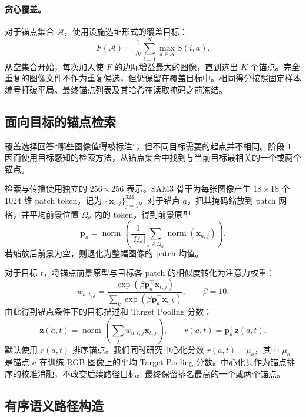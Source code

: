 \documentclass[UTF8,a4paper,10pt]{ctexart}
\begin{document}
\paragraph{贪心覆盖。}
对于锚点集合 $\mathcal{A}$，使用设施选址形式的覆盖目标：
\begin{equation}
F(\mathcal{A})=\frac{1}{N}\sum_{i=1}^{N}\max_{a\in\mathcal{A}}S(i,a).
\end{equation}
从空集合开始，每次加入使 $F$ 的边际增益最大的图像，直到选出 $K$ 个锚点。完全重复的图像文件不作为重复候选，但仍保留在覆盖目标中。相同得分按照固定样本编号打破平局。最终锚点列表及其哈希在读取掩码之前冻结。

\subsection{面向目标的锚点检索}
\label{sec:target-pooling-zh}

覆盖选择回答“哪些图像值得被标注”，但不同目标需要的起点并不相同。阶段 1 因而使用目标感知的检索方法，从锚点集合中找到与当前目标最相关的一个或两个锚点。

检索与传播使用独立的 $256\times256$ 表示。SAM3 骨干为每张图像产生 $18\times18$ 个 1024 维 patch token，记为 $\{\mathbf{x}_{i,j}\}_{j=1}^{324}$。对于锚点 $a$，把其掩码缩放到 patch 网格，并平均前景位置 $\Omega_a$ 内的 token，得到前景原型
\begin{equation}
\mathbf{p}_a=\operatorname{norm}\left(
\frac{1}{|\Omega_a|}\sum_{j\in\Omega_a}\operatorname{norm}(\mathbf{x}_{a,j})
\right).
\end{equation}
若缩放后前景为空，则退化为整幅图像的 patch 均值。

对于目标 $t$，将锚点前景原型与目标各 patch 的相似度转化为注意力权重：
\begin{equation}
w_{a,t,j}=\frac{\exp(\beta\mathbf{p}_a^{\top}\mathbf{x}_{t,j})}
{\sum_k\exp(\beta\mathbf{p}_a^{\top}\mathbf{x}_{t,k})},
\qquad \beta=10.
\end{equation}
由此得到锚点条件下的目标描述和 Target Pooling 分数：
\begin{equation}
\mathbf{z}(a,t)=\operatorname{norm}\left(\sum_jw_{a,t,j}\mathbf{x}_{t,j}\right),
\qquad
r(a,t)=\mathbf{p}_a^{\top}\mathbf{z}(a,t).
\end{equation}
默认使用 $r(a,t)$ 排序锚点。我们同时研究中心化分数 $r(a,t)-\mu_a$，其中 $\mu_a$ 是锚点 $a$ 在训练 RGB 图像上的平均 Target Pooling 分数。中心化只作为锚点排序的校准消融，不改变后续路径目标。最终保留排名最高的一个或两个锚点。

\subsection{有序语义路径构造}
\label{sec:route-construction-zh}
\end{document}
